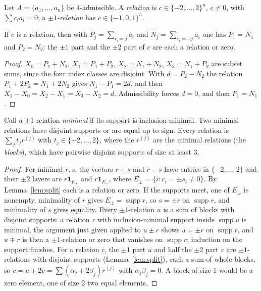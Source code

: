 Let $A=\{a_1,\dots,a_n\}$ be 4-admissible. A \emph{relation} is $c\in\{-2,\dots,2\}^n$, $c\ne0$, with $\sum c_ia_i=0$; a \emph{$\pm1$-relation} has $c\in\{-1,0,1\}^n$.

\begin{lemma}\label{lem:split}
If $c$ is a relation, then with $P_j=\sum_{c_i=j}a_i$ and $N_j=\sum_{c_i=-j}a_i$ one has $P_1=N_1$ and $P_2=N_2$: the $\pm1$ part and the $\pm2$ part of $c$ are each a relation or zero.
\end{lemma}
\begin{proof}
$X_0=P_1+N_2$, $X_1=P_1+P_2$, $X_2=N_1+N_2$, $X_3=N_1+P_2$ are subset sums, since the four index classes are disjoint. With $d=P_2-N_2$ the relation $P_1+2P_2=N_1+2N_2$ gives $N_1-P_1=2d$, and then $X_1-X_0=X_2-X_1=X_3-X_2=d$. Admissibility forces $d=0$, and then $P_1=N_1$.
\end{proof}

\begin{lemma}\label{lem:blocks}
Call a $\pm1$-relation \emph{minimal} if its support is inclusion-minimal. Two minimal relations have disjoint supports or are equal up to sign. Every relation is $\sum_jt_jr^{(j)}$ with $t_j\in\{-2,\dots,2\}$, where the $r^{(j)}$ are the minimal relations (the \emph{blocks}), which have pairwise disjoint supports of size at least $3$.
\end{lemma}
\begin{proof}
For minimal $r,s$, the vectors $r+s$ and $r-s$ have entries in $\{-2,\dots,2\}$ and their $\pm2$ layers are $r\mathbf 1_{E_+}$ and $r\mathbf 1_{E_-}$, where $E_\pm=\{i:r_i=\pm s_i\ne0\}$. By Lemma~\ref{lem:split} each is a relation or zero. If the supports meet, one of $E_\pm$ is nonempty, minimality of $r$ gives $E_\pm=\operatorname{supp}r$, so $s=\pm r$ on $\operatorname{supp}r$, and minimality of $s$ gives equality. Every $\pm1$-relation $u$ is a sum of blocks with disjoint supports: a relation $r$ with inclusion-minimal support inside $\operatorname{supp}u$ is minimal, the argument just given applied to $u\pm r$ shows $u=\pm r$ on $\operatorname{supp}r$, and $u\mp r$ is then a $\pm1$-relation or zero that vanishes on $\operatorname{supp}r$; induction on the support finishes. For a relation $c$, the $\pm1$ part $u$ and half the $\pm2$ part $v$ are $\pm1$-relations with disjoint supports (Lemma~\ref{lem:split}), each a sum of whole blocks, so $c=u+2v=\sum(\alpha_j+2\beta_j)r^{(j)}$ with $\alpha_j\beta_j=0$. A block of size $1$ would be a zero element, one of size $2$ two equal elements.
\end{proof}

